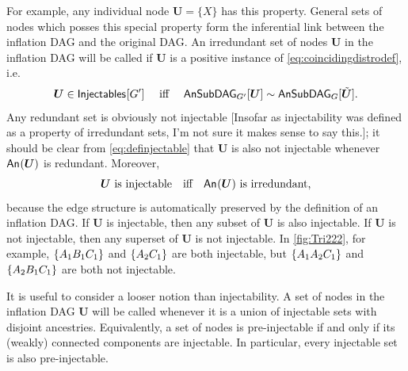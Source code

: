 {For example, any individual node $\bm{U} = \{X\}$ has this property. General sets of nodes which posses this special property form the inferential link between the inflation DAG and the original DAG. An irredundant set of nodes $\bm{U}$ in the inflation DAG will be called  if $\bm{U}$ is a positive instance of \cref{eq:coincidingdistrodef}, i.e.
\begin{align}\label{eq:definjectable}
\bm{U}\in\SmallNamedFunction{Injectables}{G'} \quad\text{ iff }\quad \ansubgraph[G']{\bm{U}}\sim\ansubgraph[G]{\subsim{\bm{U}}}.
\end{align}
Any redundant set is obviously not injectable \color{red} [Insofar as injectability was defined as a property of irredundant sets, I'm not sure it makes sense to say this.]\color{black}; it should be clear from \cref{eq:definjectable} that $\bm{U}$ is also not injectable whenever $\An{\bm{U}}$ is redundant. Moreover, 
\begin{align}\label{eq:definjectable2}
\bm{U} \text{ is injectable}\quad \text{iff}\quad \An{\bm{U}} \text{ is irredundant,}
\end{align}
because the edge structure is automatically preserved by the definition of an inflation DAG. If $\bm{U}$ is injectable, then any subset of $\bm{U}$ is also injectable. If $\bm{U}$ is not injectable, then any superset of $\bm{U}$ is not injectable. In \cref{fig:Tri222}, for example, $\brackets{A_1 B_1 C_1}$ and $\brackets{A_2 C_1}$ are both injectable, but $\brackets{A_1 A_2 C_1}$ and $\brackets{A_2 B_1 C_1}$ are both not injectable.

It is useful to consider a looser notion than injectability. A set of nodes in the inflation DAG $\bm{U}$ will be called  whenever it is a union of injectable sets with disjoint ancestries. Equivalently, a set of nodes is pre-injectable if and only if its (weakly) connected components are injectable. In particular, every injectable set is also pre-injectable.

}
